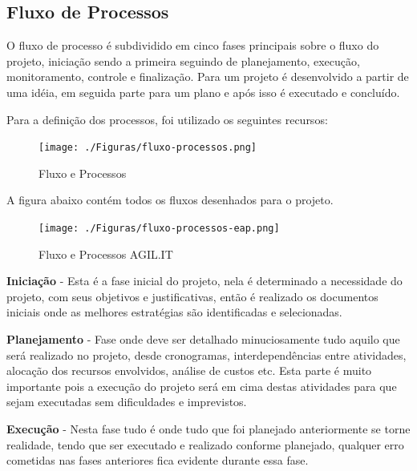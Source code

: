 \subsection{Fluxo de Processos}

{O fluxo de processo é subdividido em cinco fases principais sobre o fluxo do projeto, iniciação sendo a primeira seguindo de planejamento, execução, monitoramento, controle e finalização. Para \cite{PMG2018} um projeto é desenvolvido a partir de uma idéia, em seguida parte para um plano e após isso é executado e concluído.}

Para a definição dos processos, foi utilizado os seguintes recursos:

\begin{figure}[H]
	\caption{\label{Fluxo-Processos}Fluxo e Processos}
	\begin{center}
		\texttt{[image: ./Figuras/fluxo-processos.png]}
	\end{center}
\end{figure}



A figura abaixo contém todos os fluxos desenhados para o projeto.

\begin{figure}[H]
	\caption{\label{Fluxo-Processos-eap}Fluxo e Processos AGIL.IT}
	\begin{center}
		\texttt{[image: ./Figuras/fluxo-processos-eap.png]}
	\end{center}
\end{figure}



{\textbf{Iniciação} - Esta é a fase inicial do projeto, nela é determinado a necessidade do projeto, com seus objetivos e justificativas, então é realizado os documentos iniciais onde as melhores estratégias são identificadas e selecionadas.}

{\textbf{Planejamento} - Fase onde deve ser detalhado minuciosamente tudo aquilo que será realizado no projeto, desde cronogramas, interdependências entre atividades, alocação dos recursos envolvidos, análise de custos etc. Esta parte é muito importante pois a execução do projeto será em cima destas atividades para que sejam executadas sem dificuldades e imprevistos.}

{\textbf{Execução} - Nesta fase tudo é onde tudo que foi planejado anteriormente se torne realidade, tendo que ser executado e realizado conforme planejado, qualquer erro cometidas nas fases anteriores fica evidente durante essa fase. }


